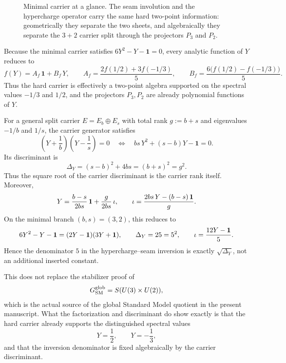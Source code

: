 \begin{figure}[t]
\caption{Minimal carrier at a glance. The seam involution and the hypercharge operator carry the same hard two-point information: geometrically they separate the two sheets, and algebraically they separate the $3+2$ carrier split through the projectors $P_3$ and $P_2$.}
\label{fig:minimal-carrier-glance}
\end{figure}

\begin{remark}
Because the minimal carrier satisfies $6Y^2-Y-\mathbf 1=0$, every analytic function of $Y$ reduces to
\[
f(Y)=A_f\,\mathbf 1+B_f\,Y,
\qquad
A_f=\frac{2f(1/2)+3f(-1/3)}{5},
\qquad
B_f=\frac{6\bigl(f(1/2)-f(-1/3)\bigr)}{5}.
\]
Thus the hard carrier is effectively a two-point algebra supported on the spectral values $-1/3$ and $1/2$, and the projectors $P_3,P_2$ are already polynomial functions of $Y$.
\end{remark}

\begin{remark}\label{rem:carrier-discriminant}
For a general split carrier $E=E_b\oplus E_s$ with total rank $g:=b+s$ and eigenvalues $-1/b$ and $1/s$, the carrier generator satisfies
\[
\left(Y+\frac{1}{b}\right)\left(Y-\frac{1}{s}\right)=0
\quad\Longleftrightarrow\quad
bs\,Y^2+(s-b)Y-\mathbf 1=0.
\]
Its discriminant is
\[
\Delta_Y=(s-b)^2+4bs=(b+s)^2=g^2.
\]
Thus the square root of the carrier discriminant is the carrier rank itself. Moreover,
\[
Y=\frac{b-s}{2bs}\,\mathbf 1+\frac{g}{2bs}\,\iota,
\qquad
\iota=\frac{2bs\,Y-(b-s)\,\mathbf 1}{g}.
\]
On the minimal branch $(b,s)=(3,2)$, this reduces to
\[
6Y^2-Y-\mathbf 1=(2Y-\mathbf 1)(3Y+\mathbf 1),
\qquad
\Delta_Y=25=5^2,
\qquad
\iota=\frac{12Y-\mathbf 1}{5}.
\]
Hence the denominator $5$ in the hypercharge--seam inversion is exactly $\sqrt{\Delta_Y}$, not an additional inserted constant.

This does not replace the stabilizer proof of
\[
G_{\mathrm{SM}}^{\mathrm{glob}}=S(U(3)\times U(2)),
\]
which is the actual source of the global Standard Model quotient in the present manuscript. What the factorization and discriminant do show exactly is that the hard carrier already supports the distinguished spectral values
\[
Y=\frac{1}{2},
\qquad
Y=-\frac{1}{3},
\]
and that the inversion denominator is fixed algebraically by the carrier discriminant.
\end{remark}

